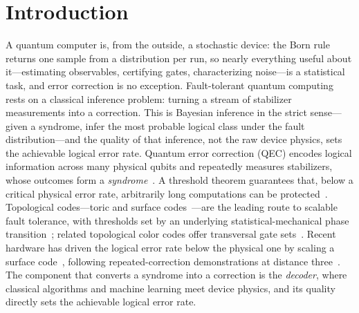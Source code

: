 \documentclass[aps,prxquantum,twocolumn,superscriptaddress,nofootinbib,longbibliography]{revtex4-2}
\begin{document}
\maketitle

\section{Introduction}
\label{sec:introduction}

A quantum computer is, from the outside, a stochastic device: the Born rule
returns one sample from a distribution per run, so nearly everything useful
about it---estimating observables, certifying gates, characterizing noise---is a
statistical task, and error correction is no exception. Fault-tolerant quantum
computing rests on a classical inference problem: turning
a stream of stabilizer measurements into a correction. This is Bayesian
inference in the strict sense---given a syndrome, infer the most probable
logical class under the fault distribution---and the quality of that inference,
not the raw device physics, sets the achievable logical error rate. Quantum error correction
(QEC) encodes logical information across many physical qubits and repeatedly
measures stabilizers, whose outcomes form a
\emph{syndrome}~\cite{shor1995scheme,nielsen2010quantum,terhal2015quantum,calderbank1996good,steane1996error,gottesman1997stabilizer}.
A threshold theorem guarantees that, below a critical physical error rate,
arbitrarily long computations can be protected~\cite{aharonov2008fault}.
Topological codes---toric and surface codes~\cite{kitaev2003fault,dennis2002topological,fowler2012surface,bravyi1998quantum}---are
the leading route to scalable fault tolerance, with thresholds set by an
underlying statistical-mechanical phase transition~\cite{wang2003confinement};
related topological color codes offer transversal gate
sets~\cite{bombin2006topological}. Recent hardware has driven the
logical error rate below the physical one by scaling a surface
code~\cite{google2023suppressing,google2025below}, following repeated-correction
demonstrations at distance three~\cite{krinner2022realizing}. The component that converts a syndrome into a
correction is the \emph{decoder}, where classical algorithms and machine learning
meet device physics, and its quality directly sets the achievable logical error
rate.
\end{document}
